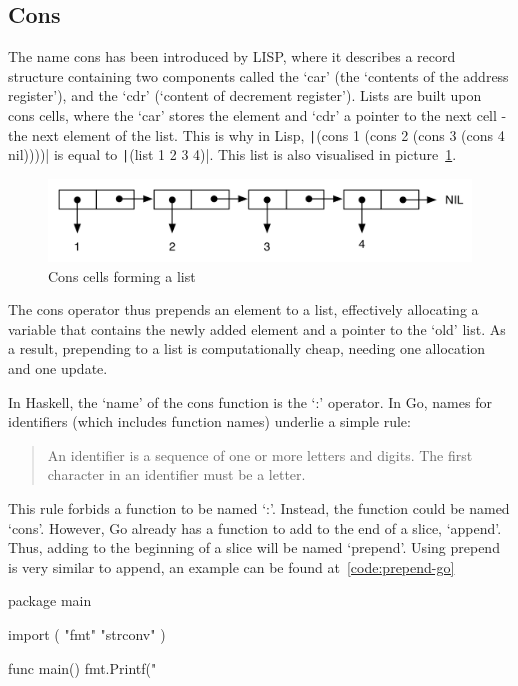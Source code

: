\subsection{Cons}

The name cons has been introduced by LISP, where it describes a record structure
containing two components called the `car' (the `contents of the address register'),
and the `cdr' (`content of decrement register').
Lists are built upon cons cells, where the `car' stores the element and `cdr' a
pointer to the next cell - the next element of the list.
This is why in Lisp, \texttt|(cons 1 (cons 2 (cons 3 (cons 4 nil))))| is equal to
\texttt|(list 1 2 3 4)|. This list is also visualised in picture~\ref{fig:cons}.

\begin{figure}[h!]
  \includegraphics[width=\linewidth]{../img/cons.png}
  \caption{Cons cells forming a list\autocite{cons-image-source}}
  \label{fig:cons}
\end{figure}

The cons operator thus prepends an element to a list, effectively allocating a
variable that contains the newly added element and a pointer to the `old' list.
As a result, prepending to a list is computationally cheap, needing one allocation
and one update.

In Haskell, the `name' of the cons function is the `:' operator.
In Go, names for identifiers (which includes function names) underlie a simple
rule:
\begin{quote}
    An identifier is a sequence of one or more letters and digits. The first
    character in an identifier must be a letter.\autocite{spec-identifiers}
\end{quote}

This rule forbids a function to be named `:'. Instead, the function could be
named `cons'. However, Go already has a function to add to the end of a slice,
`append'. Thus, adding to the beginning of a slice will be named `prepend'.
Using prepend is very similar to append, an example can be found at~\ref{code:prepend-go}

\begin{code}
    \label{code:prepend-go}
    \begin{gocode}
package main

import (
  "fmt"
  "strconv"
)

func main() {
    fmt.Printf("%
}
\end{gocode}
\end{code}

